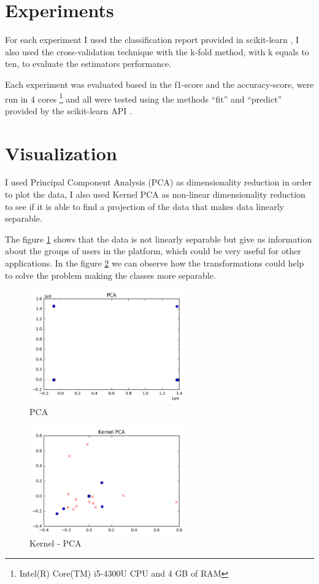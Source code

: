 \documentclass[a4paper]{article}
\begin{document}
\section{Experiments}

For each experiment I used the classification report provided
in scikit-learn \cite{scikit-learn}, I also used the cross-validation
technique with the k-fold method, with k equals to ten, to evaluate the
estimators performance.

Each experiment was evaluated based in the f1-score and the
accuracy-score, were run in 4 cores \footnote{Intel(R) Core(TM)
i5-4300U CPU and 4 GB of RAM} and all were tested using
the methods ``fit'' and ``predict'' provided by the scikit-learn
API \cite{sklearn-api}.

\section{Visualization}

I used Principal Component Analysis (PCA) as dimensionality
reduction in order to plot the data, I also used Kernel PCA
as non-linear dimensionality reduction to see if it is able
to find a projection of the data that makes data linearly separable.

The figure \ref{fig:pca} shows that the data is not linearly separable
but give us information about the groups of users in the platform,
which could be very useful for other applications. In the figure
\ref{fig:kpca} we can observe how the transformations could help
to solve the problem making the classes more separable.

\begin{figure}
  \centering
  \includegraphics[width=0.6\textwidth]{./img/pca.png}
  \caption{\label{fig:pca} PCA}
\end{figure}

\begin{figure}
  \centering
  \includegraphics[width=0.6\textwidth]{./img/kpca.png}
  \caption{\label{fig:kpca} Kernel - PCA}
\end{figure}
\end{document}
